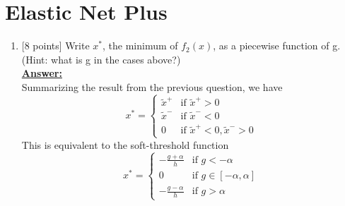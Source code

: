 \documentclass{article}
\newenvironment{qparts}{\begin{enumerate}[1.]}{\end{enumerate}}
\begin{document}
\section{Elastic Net Plus}
\begin{qparts}
\item {[}8 points{]} 
Write $x^*$, the minimum of $f_2(x)$, as a piecewise function of g. (Hint: what is
g in the cases above?)\\
\underline{\textbf{Answer:}}\\
Summarizing the result from the previous question, we have
\begin{equation}
x^*=
\begin{cases}
\tilde{x}^+ &\text{if $\tilde{x}^+>0$}\\
\tilde{x}^- &\text{if $\tilde{x}^-<0$}\\
0 &\text{if $\tilde{x}^+<0, \tilde{x}^->0$}
\end{cases}
\end{equation}
This is equivalent to the soft-threshold function
\begin{equation}
x^*=
\begin{cases}
   -\frac{g+\alpha}{h} &\text{if $g<-\alpha$}\\
   0 &\text{if $g\in\left[-\alpha, \alpha\right]$}\\
   -\frac{g-\alpha}{h} &\text{if $g>\alpha$}
   \end{cases}
\end{equation}


\end{qparts}
\end{document}
